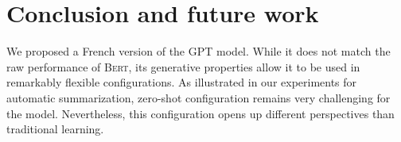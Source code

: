 

\section{Conclusion and future work}

We proposed a French version of the GPT model. While it does not match the raw performance of \textsc{Bert}, its generative properties allow it to be used in remarkably flexible configurations. As illustrated in our experiments for automatic summarization, zero-shot configuration remains very challenging for the model. Nevertheless, this configuration opens up different perspectives than traditional learning.

